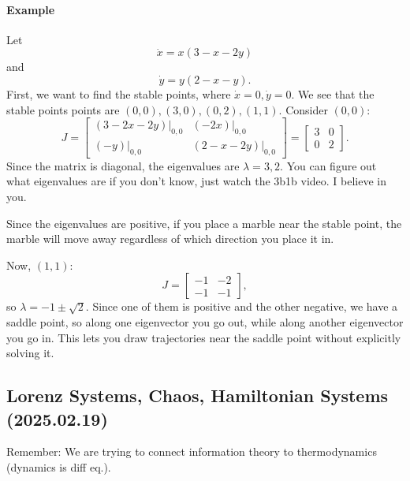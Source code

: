 \documentclass[12pt]{article}
\theoremstyle{remark}
\begin{document}
\paragraph{Example}
Let
\[\dot{x} = x(3-x-2y)\]
and
\[\dot{y} = y(2-x-y).\]
First, we want to find the stable points, where $\dot{x}=0,\dot{y}=0.$
We see that the stable points points are $(0,0),(3,0),(0,2),(1,1).$
Consider $(0,0):$
\[J=\begin{bmatrix}
    (3-2x-2y)|_{0,0}&(-2x)\vert_{0,0}\\
    (-y)\vert_{0,0}&(2-x-2y)\vert_{0,0}
\end{bmatrix}=\begin{bmatrix}
    3&0\\
    0&2
\end{bmatrix}.\]
Since the matrix is diagonal, the eigenvalues are $\lambda=3, 2.$ You can figure out what eigenvalues are if you don't know, just watch the 3b1b video. I believe in you.

Since the eigenvalues are positive, if you place a marble near the stable point, the marble will move away regardless of which direction you place it in.

Now, $(1,1):$
\[J=\begin{bmatrix}
    -1&-2\\-1&-1
\end{bmatrix},\]
so $\lambda = -1\pm \sqrt{2}.$ Since one of them is positive and the other negative, we have a saddle point, so along one eigenvector you go out, while along another eigenvector you go in. This lets you draw trajectories near the saddle point without explicitly solving it.
\subsection{Lorenz Systems, Chaos, Hamiltonian Systems (2025.02.19)}
Remember: We are trying to connect information theory to thermodynamics (dynamics is diff eq.).
\end{document}
